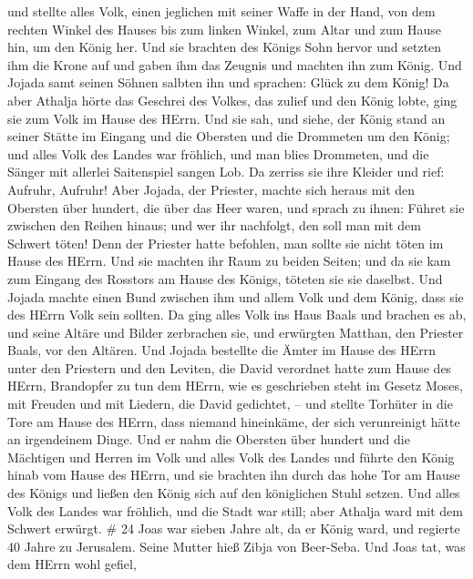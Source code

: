  und stellte alles Volk, einen jeglichen mit seiner Waffe
in der Hand, von dem rechten Winkel des Hauses bis zum linken Winkel,
zum Altar und zum Hause hin, um den König her.  Und sie
brachten des Königs Sohn hervor und setzten ihm die Krone auf und gaben
ihm das Zeugnis und machten ihn zum König. Und Jojada samt seinen Söhnen
salbten ihn und sprachen: Glück zu dem König!  Da aber
Athalja hörte das Geschrei des Volkes, das zulief und den König lobte,
ging sie zum Volk im Hause des HErrn.  Und sie sah, und
siehe, der König stand an seiner Stätte im Eingang und die Obersten und
die Drommeten um den König; und alles Volk des Landes war fröhlich, und
man blies Drommeten, und die Sänger mit allerlei Saitenspiel sangen Lob.
Da zerriss sie ihre Kleider und rief: Aufruhr, Aufruhr! 
Aber Jojada, der Priester, machte sich heraus mit den Obersten über
hundert, die über das Heer waren, und sprach zu ihnen: Führet sie
zwischen den Reihen hinaus; und wer ihr nachfolgt, den soll man mit dem
Schwert töten! Denn der Priester hatte befohlen, man sollte sie nicht
töten im Hause des HErrn.  Und sie machten ihr Raum zu
beiden Seiten; und da sie kam zum Eingang des Rosstors am Hause des
Königs, töteten sie sie daselbst.  Und Jojada machte einen
Bund zwischen ihm und allem Volk und dem König, dass sie des HErrn Volk
sein sollten.  Da ging alles Volk ins Haus Baals und
brachen es ab, und seine Altäre und Bilder zerbrachen sie, und erwürgten
Matthan, den Priester Baals, vor den Altären.  Und Jojada
bestellte die Ämter im Hause des HErrn unter den Priestern und den
Leviten, die David verordnet hatte zum Hause des HErrn, Brandopfer zu
tun dem HErrn, wie es geschrieben steht im Gesetz Moses, mit Freuden und
mit Liedern, die David gedichtet, --  und stellte Torhüter
in die Tore am Hause des HErrn, dass niemand hineinkäme, der sich
verunreinigt hätte an irgendeinem Dinge.  Und er nahm die
Obersten über hundert und die Mächtigen und Herren im Volk und alles
Volk des Landes und führte den König hinab vom Hause des HErrn, und sie
brachten ihn durch das hohe Tor am Hause des Königs und ließen den König
sich auf den königlichen Stuhl setzen.  Und alles Volk des
Landes war fröhlich, und die Stadt war still; aber Athalja ward mit dem
Schwert erwürgt. \# 24  Joas war sieben Jahre alt, da er
König ward, und regierte 40 Jahre zu Jerusalem. Seine Mutter hieß Zibja
von Beer-Seba.  Und Joas tat, was dem HErrn wohl gefiel,
